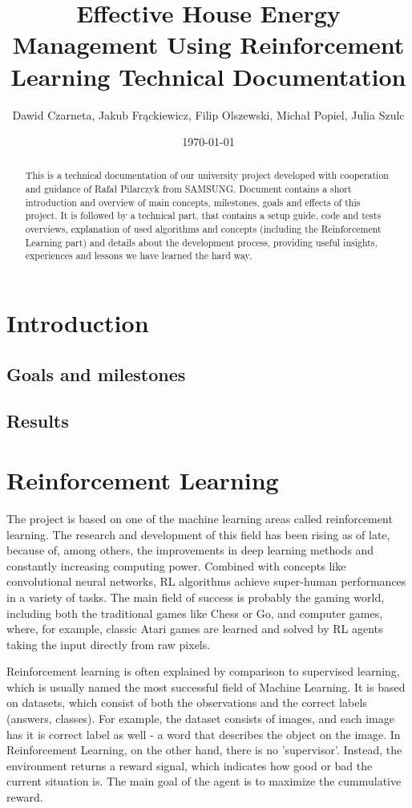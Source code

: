 \documentclass{article}
\title{Effective House Energy Management Using Reinforcement Learning Technical Documentation} %
\author{Dawid Czarneta, Jakub Frąckiewicz, Filip Olszewski, Michał Popiel, Julia Szulc}
\date{\today}
\begin{document}
\maketitle %

\begin{abstract}
This is a technical documentation of our university project developed with cooperation and
guidance of Rafał Pilarczyk from SAMSUNG. Document contains a short introduction and overview of main concepts, milestones, goals and effects of this project. It is followed by a technical part, that contains a setup guide, code and tests overviews, explanation of used algorithms and concepts (including the Reinforcement Learning part) and details about the development process, providing useful insights, experiences and lessons we have learned the hard way.
\end{abstract}

\section{Introduction}

\subsection{Goals and milestones}
\subsection{Results}

\section{Reinforcement Learning}
The project is based on one of the machine learning areas called reinforcement learning. The research and development of this field has been rising as of late, because of, among others, the improvements in deep learning methods and constantly increasing computing power. Combined with concepts like convolutional neural networks, RL algorithms  achieve super-human performances in a variety of tasks. The main field of success is probably the gaming world, including both the traditional games like Chess or Go, and computer games, where, for example, classic Atari games are learned and solved by RL agents taking the input directly from raw pixels.

Reinforcement learning is often explained by comparison to supervised learning, which is usually named the most successful field of Machine Learning. It is based on datasets, which consist of both the observations and the correct labels (answers, classes). For example, the dataset consists of images, and each image has it is correct label as well - a word that describes the object on the image. In Reinforcement Learning, on the other hand, there is no 'supervisor'. Instead, the environment returns a reward signal, which indicates how good or bad the current situation is. The main goal of the agent is to maximize the cummulative reward.
\end{document}
